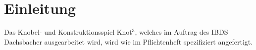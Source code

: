 \chapter{Einleitung}

Das Knobel- und Konstruktionsspiel Knot$^3$, welches im Auftrag des IBDS Dachsbacher ausgearbeitet wird, wird wie im Pflichtenheft spezifiziert angefertigt.
